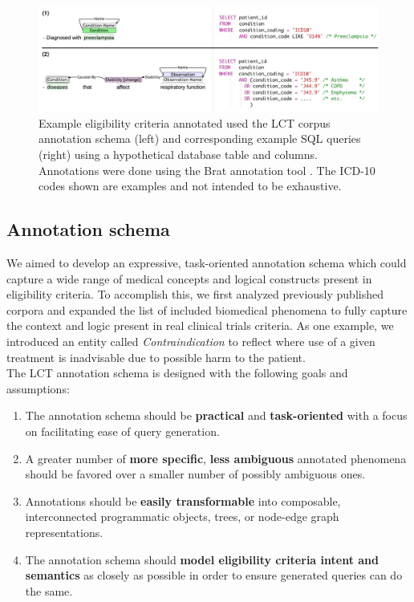 \documentclass[fleqn,10pt]{wlscirep}
\begin{document}
\begin{figure}[t]
  \includegraphics[scale=0.57]{lct_text2sql.pdf}  
\caption{Example eligibility criteria annotated used the LCT corpus annotation schema (left) and corresponding example SQL queries (right) using a hypothetical database table and columns. Annotations were done using the Brat annotation tool \cite{stenetorp2012brat}. The ICD-10 codes shown are examples and not intended to be exhaustive.}
\label{fig_lct_text2sql}
\end{figure}

\subsection*{Annotation schema}

\noindent We aimed to develop an expressive, task-oriented annotation schema which could capture a wide range of medical concepts and logical constructs present in eligibility criteria. To accomplish this, we first analyzed previously published corpora \cite{weng2011elixr,boland2012elixrtime,kang2017eliie,kury2020chia} and expanded the list of included biomedical phenomena to fully capture the context and logic present in real clinical trials criteria. As one example, we introduced an entity called \textit{Contraindication} to reflect where use of a given treatment is inadvisable due to possible harm to the patient. \\

\noindent The LCT annotation schema is designed with the following goals and assumptions:

\begin{enumerate}
    \item The annotation schema should be \textbf{practical} and  \textbf{task-oriented} with a focus on facilitating ease of query generation. 
    \item A greater number of \textbf{more specific}, \textbf{less ambiguous} annotated phenomena should be favored over a smaller number of possibly ambiguous ones.
    \item Annotations should be \textbf{easily transformable} into composable, interconnected programmatic objects, trees, or node-edge graph representations.
    \item The annotation schema should \textbf{model eligibility criteria intent and semantics} as closely as possible in order to ensure generated queries can do the same.
\end{enumerate}
\end{document}
